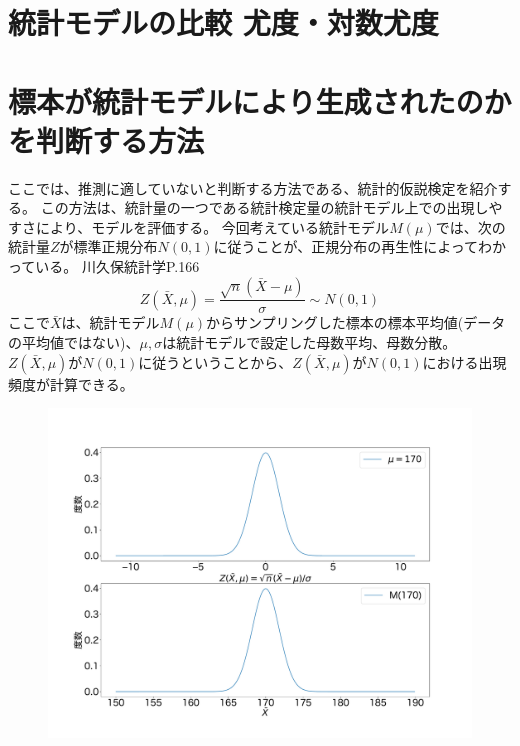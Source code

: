 \section{統計モデルの比較 尤度・対数尤度}



\section{標本が統計モデルにより生成されたのかを判断する方法}%
ここでは、推測に適していないと判断する方法である、統計的仮説検定を紹介する。
この方法は、統計量の一つである統計検定量の統計モデル上での出現しやすさにより、モデルを評価する。
今回考えている統計モデル$M(\mu)$では、次の統計量$Z$が標準正規分布$N(0,1)$に従うことが、正規分布の再生性によってわかっている。
 川久保統計学P.166
 \fi
$$
Z(\bar{X},\mu)=\frac{\sqrt{n}(\bar{X}-\mu)}{\sigma} \sim N(0,1)
$$
ここで$\bar{X}$は、統計モデル$M(\mu)$からサンプリングした標本の標本平均値(データの平均値ではない)、$\mu,\sigma$は統計モデルで設定した母数平均、母数分散。
$Z(\bar{X},\mu)$が$N(0,1)$に従うということから、$Z(\bar{X},\mu)$が$N(0,1)$における出現頻度が計算できる。

\begin{figure}
\begin{center}
    \includegraphics[width=15cm]{./image/03_/normal_Z_frequency.pdf}
    \label{fig:cm_standard_normal_distribution}
  \end{center}
\end{figure}

